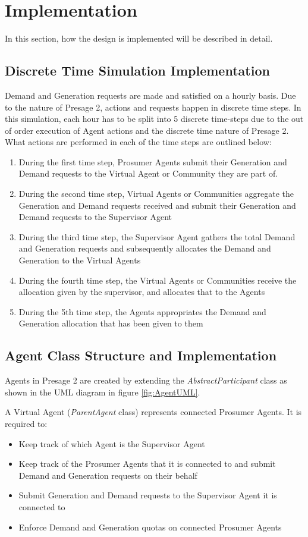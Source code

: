 \chapter{Implementation}
\label{Implementation}
In this section, how the design is implemented will be described in detail. 

\section*{Discrete Time Simulation Implementation}
Demand and Generation requests are made and satisfied on a hourly basis. Due to the nature of Presage 2, actions and requests happen in discrete time steps. In this simulation, each hour has to be split into 5 discrete time-steps due to the out of order execution of Agent actions and the discrete time nature of Presage 2. What actions are performed in each of the time steps are outlined below:
\begin{enumerate}
	\item During the first time step, Prosumer Agents submit their Generation and Demand requests to the Virtual Agent or Community they are part of.
	\item During the second time step, Virtual Agents or Communities aggregate the Generation and Demand requests received and submit their Generation and Demand requests to the Supervisor Agent
	\item During the third time step, the Supervisor Agent gathers the total Demand and Generation requests and subsequently allocates the Demand and Generation to the Virtual Agents
	\item During the fourth time step, the Virtual Agents or Communities receive the allocation given by the supervisor, and allocates that to the Agents
	\item During the 5th time step, the Agents appropriates the Demand and Generation allocation that has been given to them
\end{enumerate}

\section*{Agent Class Structure and Implementation}
Agents in Presage 2 are created by extending the \textit{AbstractParticipant} class as shown in the UML diagram in figure \ref{fig:AgentUML}. 

A Virtual Agent (\textit{ParentAgent} class) represents connected Prosumer Agents. It is required to:
\begin{itemize}
	\item Keep track of which Agent is the Supervisor Agent
	\item Keep track of the Prosumer Agents that it is connected to and submit Demand and Generation requests on their behalf
	\item Submit Generation and Demand requests to the Supervisor Agent it is connected to
	\item Enforce Demand and Generation quotas on connected Prosumer Agents
\end{itemize}

